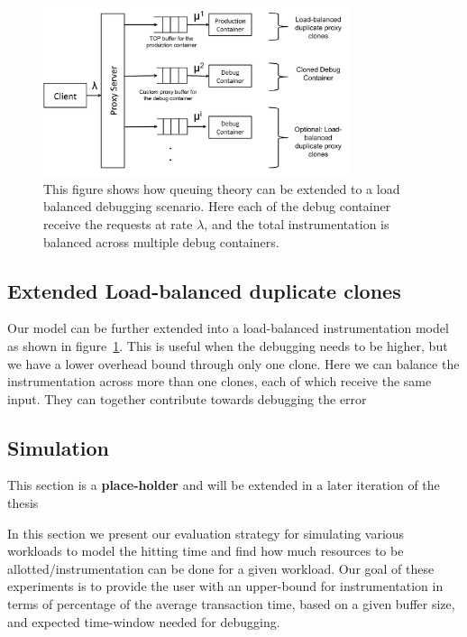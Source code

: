 \begin{figure}[ht!]
	\begin{center}
		\includegraphics[width=0.8\textwidth]{queue/figs/queueBalanced.pdf}
		\caption{This figure shows how queuing theory can be extended to a load balanced debugging scenario. Here each of the debug container receive the requests at rate $\lambda$, and the total instrumentation is balanced across multiple debug containers.}
		\label{fig:queueBalanced}
	\end{center}
\end{figure}

\subsection{Extended Load-balanced duplicate clones}

Our model can be further extended into a load-balanced instrumentation model as shown in figure~\ref{fig:queueBalanced}. 
This is useful when the debugging needs to be higher, but we have a lower overhead bound through only one clone.
Here we can balance the instrumentation across more than one clones, each of which receive the same input.
They can together contribute towards debugging the error

\subsection{Simulation}
\label{sec:queueEval}

This section is a \textbf{place-holder} and will be extended in a later iteration of the thesis

In this section we present our evaluation strategy for simulating various workloads to model the hitting time and find how much resources to be allotted/instrumentation can be done for a given workload. 
Our goal of these experiments is to provide the user with an upper-bound for instrumentation in terms of percentage of the average transaction time, based on a given buffer size, and expected time-window needed for debugging.

